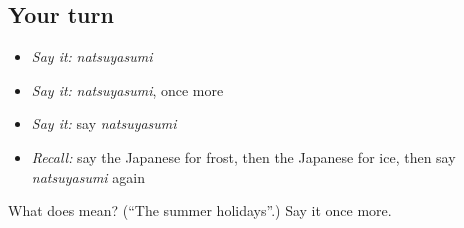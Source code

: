 \subsection*{Your turn}
\begin{itemize}
\raggedright
  \item \emph{Say it:} \emph{natsuyasumi}
  \item \emph{Say it:} \emph{natsuyasumi}, once more
  \item \emph{Say it:} say \emph{natsuyasumi}
  \item \emph{Recall:} say the Japanese for frost, then the Japanese for ice, then say \emph{natsuyasumi} again
\end{itemize}

\begin{tcolorbox}[breakable,colback=teal!4,colframe=teal!35!black,title={Before you move on}]
What does  mean? (\textquotedblleft{}The summer holidays\textquotedblright{}.) Say it once more.
\end{tcolorbox}
